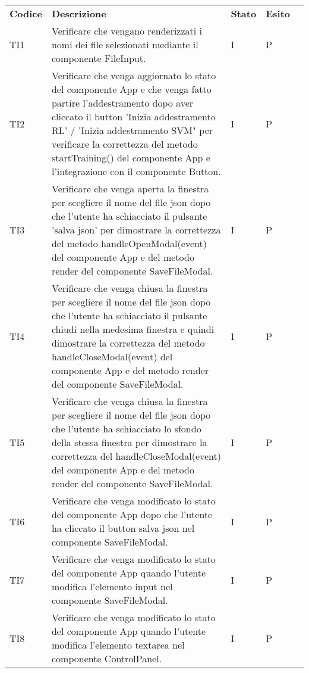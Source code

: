 \begin{longtable} {
		>{}p{15mm} 
		>{}p{79.5mm}
		>{}p{15mm} 
		>{}p{15mm}
		>{}p{0mm}}
	\rowcolor{gray!50}
	\textbf{Codice} & \textbf{Descrizione} & \textbf{Stato} & \textbf{Esito} &\TBstrut \\
    TI1      &  Verificare che vengano renderizzati i nomi dei file selezionati mediante il componente FileInput.& I & P  &\TBstrut \\ [2mm]
    TI2      &  Verificare che venga aggiornato lo stato del componente App e che venga fatto partire l'addestramento dopo aver cliccato il button 'Inizia addestramento RL' / 'Inizia addestramento SVM" per verificare la correttezza del metodo startTraining() del componente App e l'integrazione con il componente Button.& I & P  &\TBstrut \\ [2mm]
    TI3      &  Verificare che venga aperta la finestra per scegliere il nome del file json dopo che l’utente ha schiacciato il pulsante 'salva json' per dimostrare la correttezza del metodo handleOpenModal(event) del componente App e del metodo render del componente SaveFileModal.& I & P  &\TBstrut \\ [2mm]
    TI4      &  Verificare che venga chiusa la finestra per scegliere il nome del file json dopo che l’utente ha schiacciato il pulsante chiudi nella medesima finestra e quindi dimostrare la correttezza del metodo handleCloseModal(event) del componente App e del metodo render del componente SaveFileModal.& I & P  &\TBstrut \\ [2mm]
    TI5      &  Verificare che venga chiusa la finestra per scegliere il nome del file json dopo che l’utente ha schiacciato lo sfondo della stessa finestra per dimostrare la correttezza del handleCloseModal(event) del componente App e del metodo render del componente SaveFileModal.& I & P  &\TBstrut \\ [2mm]
    TI6      &  Verificare che venga modificato lo stato del componente App dopo che l'utente ha cliccato il button salva json nel componente SaveFileModal.& I & P  &\TBstrut \\ [2mm]
    TI7      &  Verificare che venga modificato lo stato del componente App quando l'utente modifica l'elemento input nel componente SaveFileModal.& I & P  &\TBstrut \\ [2mm]
    TI8      &  Verificare che venga modificato lo stato del componente App quando l'utente modifica l'elemento textarea nel componente ControlPanel.& I & P  &\TBstrut \\ [2mm]

\end{longtable}
